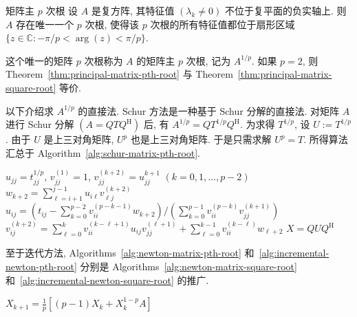 \begin{Theorem}{{矩阵主 $p$ 次根}}\label{thm:principal-matrix-pth-root}
{设 $A$ 是复方阵, 其特征值 $(\lambda_k\ne0)$ 不位于复平面的负实轴上. 则 $A$ 存在唯一一个 $p$ 次根, 使得该 $p$ 次根的所有特征值都位于扇形区域 $\{z\in\mathbb{C}:-\pi/p<\arg(z)<\pi/p\}$.}
\end{Theorem}

{这个唯一的矩阵 $p$ 次根称为 $A$ 的矩阵主 $p$ 次根, 记为 $A^{1/p}$. 如果 $p=2$, 则 Theorem~\ref{thm:principal-matrix-pth-root} 与 Theorem~\ref{thm:principal-matrix-square-root} 等价.}

{以下介绍求 $A^{1/p}$ 的直接法. Schur 方法是一种基于 Schur 分解的直接法. 对矩阵 $A$ 进行 Schur 分解 $(A=QTQ^{\mathrm H})$ 后, 有 $A^{1/p}=QT^{1/p}Q^{\mathrm H}$. 为求得 $T^{1/p}$, 设 $U:=T^{1/p}$. 由于 $U$ 是上三对角矩阵, $U^p$ 也是上三对角矩阵. 于是只需求解 $U^p=T$. 所得算法汇总于 Algorithm~\ref{alg:schur-matrix-pth-root}.}

\begin{algorithm}[H]\caption{{(直接法) 求 $X=A^{1/p}$ 的 Schur 方法}}\label{alg:schur-matrix-pth-root}\begin{algorithmic}[1]
\State $u_{jj}=t_{jj}^{1/p}$, $v_{jj}^{(1)}=1$, $v_{jj}^{(k+2)}=u_{jj}^{k+1}$ $(k=0,1,\ldots,p-2)$
\State $w_{k+2}=\sum_{\ell=i+1}^{j-1}u_{i\ell}v_{\ell j}^{(k+2)}$
\EndFor
\State $u_{ij}=(t_{ij}-\sum_{k=0}^{p-2}v_{ii}^{(p-k-1)}w_{k+2})/(\sum_{k=0}^{p-1}v_{ii}^{(p-k)}v_{jj}^{(k+1)})$
\State $v_{ij}^{(k+2)}=\sum_{\ell=0}^k v_{ii}^{(k-\ell+1)}u_{ij}v_{jj}^{(\ell+1)}+\sum_{\ell=0}^{k-1}v_{ii}^{(k-\ell)}w_{\ell+2}$
\EndFor
\EndFor
\EndFor
\State $X=QUQ^{\mathrm H}$
\end{algorithmic}\end{algorithm}

{至于迭代方法, Algorithms~\ref{alg:newton-matrix-pth-root} 和~\ref{alg:incremental-newton-pth-root} 分别是 Algorithms~\ref{alg:newton-matrix-square-root} 和~\ref{alg:incremental-newton-square-root} 的推广.}

\begin{algorithm}[H]\caption{{(迭代法) 求 $A^{1/p}$ 的 Newton 方法}}\label{alg:newton-matrix-pth-root}\label{srcpage:printed-198}\begin{algorithmic}[1]
\State $X_{k+1}=\frac{1}{p}[(p-1)X_k+X_k^{1-p}A]$
\EndFor
\end{algorithmic}\end{algorithm}

